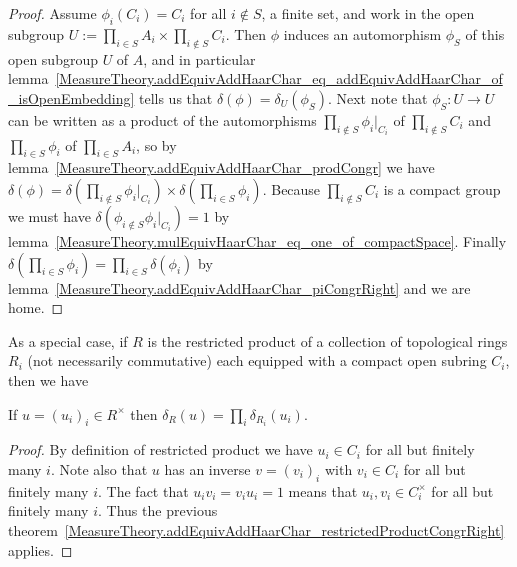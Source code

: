 \begin{proof}
  \leanok
  Assume $\phi_i(C_i)=C_i$ for all $i\not\in S$, a finite set, and work in the
  open subgroup $U:=\prod_{i\in S}A_i\times\prod_{i\not\in S}C_i$. Then $\phi$ induces
  an automorphism $\phi_S$ of this open subgroup $U$ of $A$, and in particular
  lemma~\ref{MeasureTheory.addEquivAddHaarChar_eq_addEquivAddHaarChar_of_isOpenEmbedding} tells us
  that $\delta(\phi)=\delta_U(\phi_S)$.
  Next note that $\phi_S:U\to U$ can be written as a product of the automorphisms
  $\prod_{i\not\in S}\phi_i|_{C_i}$ of $\prod_{i\not\in S}C_i$ and
  $\prod_{i\in S}\phi_i$ of $\prod_{i\in S}A_i$, so by lemma~\ref{MeasureTheory.addEquivAddHaarChar_prodCongr}
  we have $\delta(\phi)=\delta(\prod_{i\not\in S}\phi_i|_{C_i})\times\delta(\prod_{i\in S}\phi_i).$
  Because $\prod_{i\not\in S}C_i$ is a compact
  group we must have $\delta(\phi_{i\not\in S}\phi_i|_{C_i})=1$
  by lemma~\ref{MeasureTheory.mulEquivHaarChar_eq_one_of_compactSpace}. Finally
  $\delta(\prod_{i\in S}\phi_i)=\prod_{i\in S}\delta(\phi_i)$ by
  lemma~\ref{MeasureTheory.addEquivAddHaarChar_piCongrRight} and we are home.
\end{proof}

As a special case, if $R$ is the restricted product of a collection of topological rings $R_i$
  (not necessarily commutative) each equipped with a compact open subring $C_i$, then
  we have

\begin{corollary}
  \label{MeasureTheory.ringHaarChar_restrictedProduct}
  \leanok
  If $u=(u_i)_i\in R^\times$ then $\delta_R(u)=\prod_i\delta_{R_i}(u_i)$.
\end{corollary}
\begin{proof}
  \leanok
  By definition of restricted product we have $u_i\in C_i$ for all but finitely many $i$.
  Note also that $u$ has an inverse $v=(v_i)_i$ with $v_i\in C_i$ for all but finitely many $i$.
  The fact that $u_iv_i=v_iu_i=1$ means that $u_i,v_i\in C_i^\times$ for all but finitely many $i$.
  Thus the previous theorem~\ref{MeasureTheory.addEquivAddHaarChar_restrictedProductCongrRight} applies.
\end{proof}

